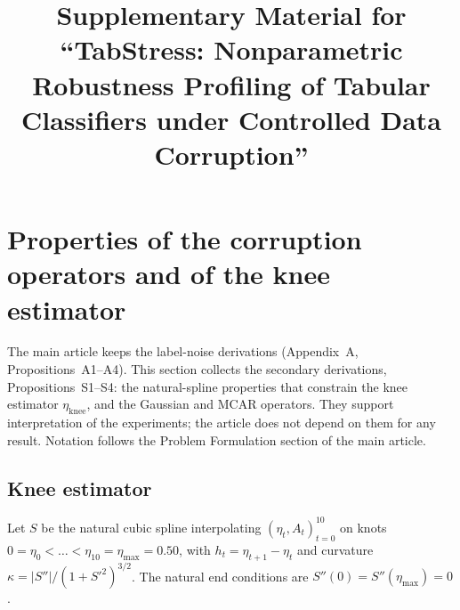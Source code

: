 \documentclass[pdflatex,sn-mathphys]{sn-jnl}
\newcommand{\etamax}{\eta_{\max}}
\newcommand{\etaknee}{\eta_{\mathrm{knee}}}
\theoremstyle{thmstyleone}
\begin{document}
\title[Supplementary Material for TabStress]{Supplementary Material for ``TabStress: Nonparametric Robustness Profiling of Tabular Classifiers under Controlled Data Corruption''}
\author[1]{ }
\author*[1]{ }

\maketitle

\section{Properties of the corruption operators and of the knee estimator}\label{sup:props}
The main article keeps the label-noise derivations (Appendix~A, Propositions~A1--A4). This section collects the secondary derivations, Propositions~S1--S4: the natural-spline properties that constrain the knee estimator $\etaknee$, and the Gaussian and MCAR operators. They support interpretation of the experiments; the article does not depend on them for any result. Notation follows the Problem Formulation section of the main article.

\subsection{Knee estimator}
Let $S$ be the natural cubic spline interpolating $(\eta_t,A_t)_{t=0}^{10}$ on knots $0=\eta_0<\dots<\eta_{10}=\etamax=0.50$, with $h_t=\eta_{t+1}-\eta_t$ and curvature $\kappa=\lvert S''\rvert/(1+S'^{2})^{3/2}$. The natural end conditions are $S''(0)=S''(\etamax)=0$.
\end{document}
